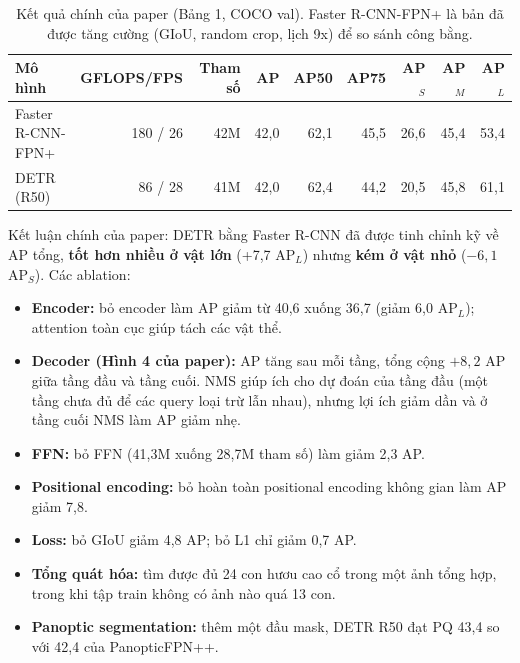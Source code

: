 \documentclass[11pt, a4paper]{article}
\begin{document}
\begin{table}[H]
  \centering
  \caption{Kết quả chính của paper (Bảng 1, COCO val). Faster R-CNN-FPN+ là bản đã được tăng cường (GIoU, random crop, lịch 9x) để so sánh công bằng.}
  \label{tab:paper}
  \small
  \begin{tabular}{lrrrrrrrr}
    \toprule
    \textbf{Mô hình} & \textbf{GFLOPS/FPS} & \textbf{Tham số} & \textbf{AP} & \textbf{AP50} & \textbf{AP75} & \textbf{AP$_S$} & \textbf{AP$_M$} & \textbf{AP$_L$} \\
    \midrule
    Faster R-CNN-FPN+ & 180 / 26 & 42M & 42,0 & 62,1 & 45,5 & 26,6 & 45,4 & 53,4 \\
    DETR (R50)        & 86 / 28  & 41M & 42,0 & 62,4 & 44,2 & 20,5 & 45,8 & 61,1 \\
    \bottomrule
  \end{tabular}
\end{table}

Kết luận chính của paper: DETR bằng Faster R-CNN đã được tinh chỉnh kỹ về AP tổng, \textbf{tốt hơn nhiều ở vật lớn} (+7,7 AP$_L$) nhưng \textbf{kém ở vật nhỏ} ($-6{,}1$ AP$_S$). Các ablation:
\begin{itemize}
  \item \textbf{Encoder:} bỏ encoder làm AP giảm từ 40,6 xuống 36,7 (giảm 6,0 AP$_L$); attention toàn cục giúp tách các vật thể.
  \item \textbf{Decoder (Hình 4 của paper):} AP tăng sau mỗi tầng, tổng cộng $+8{,}2$ AP giữa tầng đầu và tầng cuối. NMS giúp ích cho dự đoán của tầng đầu (một tầng chưa đủ để các query loại trừ lẫn nhau), nhưng lợi ích giảm dần và ở tầng cuối NMS làm AP giảm nhẹ.
  \item \textbf{FFN:} bỏ FFN (41,3M xuống 28,7M tham số) làm giảm 2,3 AP.
  \item \textbf{Positional encoding:} bỏ hoàn toàn positional encoding không gian làm AP giảm 7,8.
  \item \textbf{Loss:} bỏ GIoU giảm 4,8 AP; bỏ L1 chỉ giảm 0,7 AP.
  \item \textbf{Tổng quát hóa:} tìm được đủ 24 con hươu cao cổ trong một ảnh tổng hợp, trong khi tập train không có ảnh nào quá 13 con.
  \item \textbf{Panoptic segmentation:} thêm một đầu mask, DETR R50 đạt PQ 43,4 so với 42,4 của PanopticFPN++.
\end{itemize}
\end{document}
